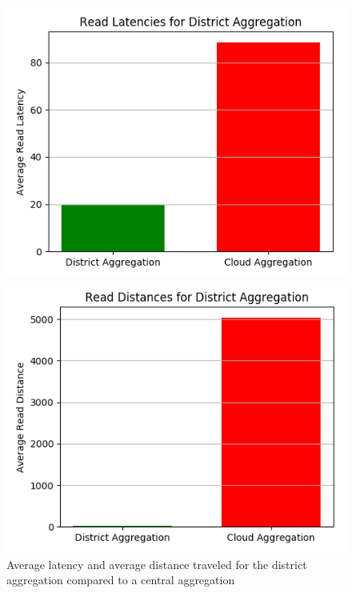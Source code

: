 \begin{figure}[H]
\begin{minipage}{0.49\textwidth}
\centering
\includegraphics[width=1\linewidth]{Figures/Evaluation/read-by-latency-District-Aggregation.png}
\end{minipage}
\hfill
\begin{minipage}{0.49\textwidth}
\centering
\includegraphics[width=1\linewidth]{Figures/Evaluation/read-by-distance-District-Aggregation.png}
\end{minipage}
\label{fig:read-by-district}
\caption{Average latency and average distance traveled for the district aggregation compared to a central aggregation}
\end{figure}


